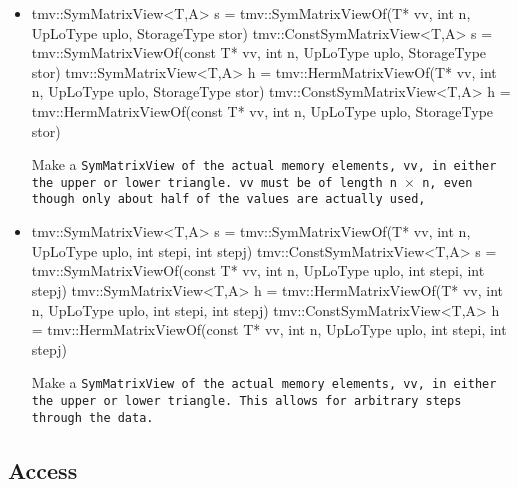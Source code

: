 \begin{itemize}
\item
\begin{tmvcode}
tmv::SymMatrixView<T,A> s = 
      tmv::SymMatrixViewOf(T* vv, int n, UpLoType uplo, 
      StorageType stor)
tmv::ConstSymMatrixView<T,A> s =
      tmv::SymMatrixViewOf(const T* vv, int n, UpLoType uplo, 
      StorageType stor)
tmv::SymMatrixView<T,A> h =
      tmv::HermMatrixViewOf(T* vv, int n, UpLoType uplo, 
      StorageType stor)
tmv::ConstSymMatrixView<T,A> h =
      tmv::HermMatrixViewOf(const T* vv, int n, UpLoType uplo, 
      StorageType stor)
\end{tmvcode}
Make a \tt{SymMatrixView} of the actual memory elements, \tt{vv}, in either the 
upper or lower triangle.
\tt{vv} must be of length \tt{n} $\times$ \tt{n}, even though only about half 
of the values are actually used,

\item
\begin{tmvcode}
tmv::SymMatrixView<T,A> s = 
      tmv::SymMatrixViewOf(T* vv, int n, UpLoType uplo, int stepi, 
      int stepj)
tmv::ConstSymMatrixView<T,A> s =
      tmv::SymMatrixViewOf(const T* vv, int n, UpLoType uplo, 
      int stepi, int stepj)
tmv::SymMatrixView<T,A> h =
      tmv::HermMatrixViewOf(T* vv, int n, UpLoType uplo, int stepi, 
      int stepj)
tmv::ConstSymMatrixView<T,A> h =
      tmv::HermMatrixViewOf(const T* vv, int n, UpLoType uplo,
      int stepi, int stepj)
\end{tmvcode}
Make a \tt{SymMatrixView} of the actual memory elements, \tt{vv}, in either the 
upper or lower triangle.  This allows for arbitrary steps through the data.

\end{itemize}

\subsection{Access}
\label{SymMatrix_Access}

